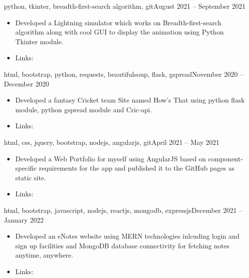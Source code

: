 \documentclass[10pt,a4paper]{altacv}
\begin{document}


{\MakeLowercase{Python, Tkinter, Breadth-First-search algorithm, Git}}{August 2021 -- September 2021}{}
\begin{itemize}
\item Developed a Lightning simulator which works on Breadth-first-search algorithm along with cool GUI to display the animation using Python Tkinter module.
\item Links: 
\end{itemize}
\divider

{\MakeLowercase{html, Bootstrap, Python, requests, BeautifulSoup, flask, gspread}}{November 2020 -- December 2020}{}
\begin{itemize}
\item Developed a fantasy Cricket team Site named How's That using python flask module, python gspread module and Cric-api.
\item Links: 
\end{itemize}
\divider


{\MakeLowercase{HTML, CSS, jQuery, Bootstrap, Nodejs, AngularJS, Git}}{April 2021 -- May 2021}{}
\begin{itemize}
\item Developed a Web Portfolio for myself using AngularJS based on component-specific requirements for the app and published it to the GitHub pages as static site.
\item Links: 
\end{itemize}
\divider


{\MakeLowercase{HTML, Bootstrap, javascript, nodejs, ReactJS, mongoDB, expressjs}}{December 2021 -- January 2022}{}
\begin{itemize}
\item Developed an eNotes website using MERN technologies inlcuding login and sign up facilities and MongoDB database connectivity for fetching notes anytime, anywhere.
\item Links: 
\end{itemize}
\divider
\end{document}
